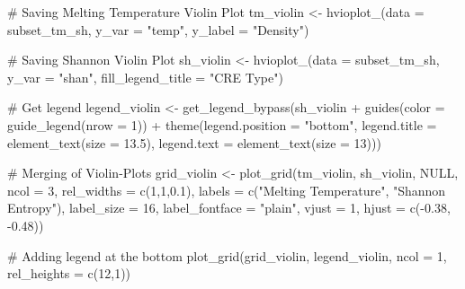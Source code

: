 \documentclass[
  letterpaper,
]{article}
\newenvironment{Shaded}{\begin{snugshade}}{\end{snugshade}}
\newcommand{\AttributeTok}[1]{\textcolor[rgb]{0.40,0.45,0.13}{#1}}
\newcommand{\CommentTok}[1]{\textcolor[rgb]{0.37,0.37,0.37}{#1}}
\newcommand{\ConstantTok}[1]{\textcolor[rgb]{0.56,0.35,0.01}{#1}}
\newcommand{\DecValTok}[1]{\textcolor[rgb]{0.68,0.00,0.00}{#1}}
\newcommand{\FloatTok}[1]{\textcolor[rgb]{0.68,0.00,0.00}{#1}}
\newcommand{\FunctionTok}[1]{\textcolor[rgb]{0.28,0.35,0.67}{#1}}
\newcommand{\NormalTok}[1]{\textcolor[rgb]{0.00,0.23,0.31}{#1}}
\newcommand{\OtherTok}[1]{\textcolor[rgb]{0.00,0.23,0.31}{#1}}
\newcommand{\SpecialCharTok}[1]{\textcolor[rgb]{0.37,0.37,0.37}{#1}}
\newcommand{\StringTok}[1]{\textcolor[rgb]{0.13,0.47,0.30}{#1}}
\begin{document}
\begin{Shaded}
\begin{Highlighting}[]
\CommentTok{\# Saving Melting Temperature Violin Plot }
\NormalTok{tm\_violin }\OtherTok{\textless{}{-}} \FunctionTok{hvioplot\_}\NormalTok{(}\AttributeTok{data =}\NormalTok{ subset\_tm\_sh, }
                       \AttributeTok{y\_var =} \StringTok{"temp"}\NormalTok{, }
                       \AttributeTok{y\_label =} \StringTok{"Density"}\NormalTok{)}

\CommentTok{\# Saving Shannon Violin Plot }
\NormalTok{sh\_violin }\OtherTok{\textless{}{-}} \FunctionTok{hvioplot\_}\NormalTok{(}\AttributeTok{data =}\NormalTok{ subset\_tm\_sh, }
                       \AttributeTok{y\_var =} \StringTok{"shan"}\NormalTok{, }
                       \AttributeTok{fill\_legend\_title =} \StringTok{"CRE Type"}\NormalTok{)}

\CommentTok{\# Get legend}
\NormalTok{legend\_violin }\OtherTok{\textless{}{-}} \FunctionTok{get\_legend\_bypass}\NormalTok{(sh\_violin }\SpecialCharTok{+}
  \FunctionTok{guides}\NormalTok{(}\AttributeTok{color =} \FunctionTok{guide\_legend}\NormalTok{(}\AttributeTok{nrow =} \DecValTok{1}\NormalTok{)) }\SpecialCharTok{+}
  \FunctionTok{theme}\NormalTok{(}\AttributeTok{legend.position =} \StringTok{"bottom"}\NormalTok{,}
        \AttributeTok{legend.title =} \FunctionTok{element\_text}\NormalTok{(}\AttributeTok{size =} \FloatTok{13.5}\NormalTok{),}
        \AttributeTok{legend.text =} \FunctionTok{element\_text}\NormalTok{(}\AttributeTok{size =} \DecValTok{13}\NormalTok{)))}

\CommentTok{\# Merging of Violin{-}Plots }
\NormalTok{grid\_violin }\OtherTok{\textless{}{-}} \FunctionTok{plot\_grid}\NormalTok{(tm\_violin, sh\_violin, }\ConstantTok{NULL}\NormalTok{,}
                 \AttributeTok{ncol =} \DecValTok{3}\NormalTok{, }\AttributeTok{rel\_widths =} \FunctionTok{c}\NormalTok{(}\DecValTok{1}\NormalTok{,}\DecValTok{1}\NormalTok{,}\FloatTok{0.1}\NormalTok{),}
                 \AttributeTok{labels =} \FunctionTok{c}\NormalTok{(}\StringTok{"Melting Temperature"}\NormalTok{,}
                 \StringTok{"Shannon Entropy"}\NormalTok{), }\AttributeTok{label\_size =} \DecValTok{16}\NormalTok{,}
                 \AttributeTok{label\_fontface =} \StringTok{"plain"}\NormalTok{, }\AttributeTok{vjust =} \DecValTok{1}\NormalTok{,}
                 \AttributeTok{hjust =} \FunctionTok{c}\NormalTok{(}\SpecialCharTok{{-}}\FloatTok{0.38}\NormalTok{, }\SpecialCharTok{{-}}\FloatTok{0.48}\NormalTok{))}

\CommentTok{\# Adding legend at the bottom}
\FunctionTok{plot\_grid}\NormalTok{(grid\_violin, legend\_violin,}
          \AttributeTok{ncol =} \DecValTok{1}\NormalTok{, }\AttributeTok{rel\_heights =} \FunctionTok{c}\NormalTok{(}\DecValTok{12}\NormalTok{,}\DecValTok{1}\NormalTok{))}
\end{Highlighting}
\end{Shaded}
\end{document}
